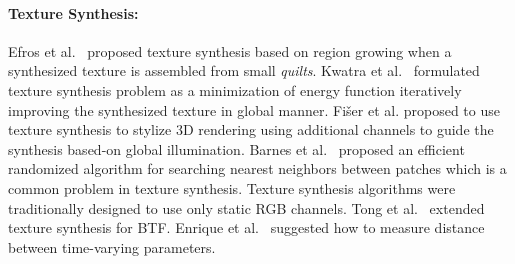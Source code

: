 \documentclass[11pt]{article}
\begin{document}
\paragraph{Texture Synthesis:} Efros et al.~\cite{Efros2001} proposed texture synthesis based on region growing when a synthesized texture is assembled from small \emph{quilts}. Kwatra et al.~\cite{Kwatra2005} formulated texture synthesis problem as a minimization of energy function iteratively improving the synthesized texture in global manner. Fi\v{s}er et al.\cite{Fiser2016} proposed to use texture synthesis to stylize 3D rendering using additional channels to guide the synthesis based-on global illumination. Barnes et al.~\cite{Barnes2009} proposed an efficient randomized algorithm for searching nearest neighbors between patches which is a common problem in texture synthesis. Texture synthesis algorithms were traditionally designed to use only static RGB channels. Tong et al.~\cite{Tong2002} extended texture synthesis for BTF. Enrique et al.~\cite{Enrique2005} suggested how to measure distance between time-varying parameters.
\end{document}
